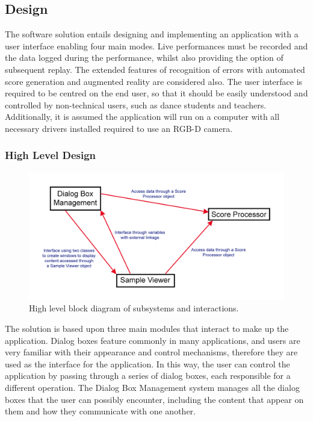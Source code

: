 \documentclass[11pt,a4paper]{article}
\begin{document}
\subsection{Design}
The software solution entails designing and implementing an application with a user interface enabling four main modes. Live performances must be recorded and the data logged during the performance, whilst also providing the option of subsequent replay. The extended features of recognition of errors with automated score generation and augmented reality are considered also. The user interface is required to be centred on the end user, so that it should be easily understood and controlled by non-technical users, such as dance students and teachers. Additionally, it is assumed the application will run on a computer with all necessary drivers installed required to use an RGB-D camera.

\subsubsection{High Level Design}

\begin{figure}[H]
\centering
\includegraphics[scale=0.15]{System_Architecture_Diagram.jpg}
\caption{High level block diagram of subsystems and interactions.}
\label{system_architecture}
\end{figure}

The solution is based upon three main modules that interact to make up the application. Dialog boxes feature commonly in many applications, and users are very familiar with their appearance and control mechanisms, therefore they are used as the interface for the application. In this way, the user can control the application by passing through a series of dialog boxes, each responsible for a different operation. The Dialog Box Management system manages all the dialog boxes that the user can possibly encounter, including the content that appear on them and how they communicate with one another.
\end{document}
